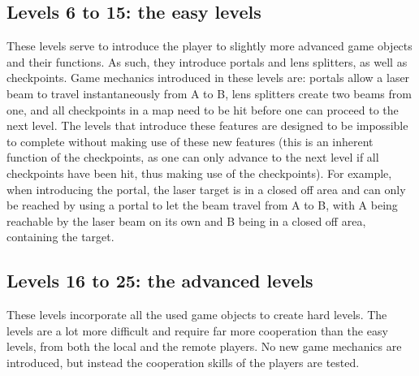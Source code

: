 		\subsection{Levels 6 to 15: the easy levels} \label{ssec: easylevels}
			These levels serve to introduce the player to slightly more advanced
			game objects and their functions. As such, they introduce portals
			and lens splitters, as well as checkpoints. Game mechanics introduced
			in these levels are: portals allow a laser beam to travel instantaneously
			from A to B, lens splitters create two beams from one, and all 
			checkpoints in a map need to be hit before one can proceed to the 
			next level. The levels that introduce these features are designed 
			to be impossible to complete without making use of these new features 
			(this is an inherent function of the checkpoints, as one can only 
			advance to the next level if all checkpoints have been hit, thus 
			making use of the checkpoints). For example, when introducing the 
			portal, the laser target is in a closed off area and can only be 
			reached by using a portal to let the beam travel from A to B, with A
			being reachable by the laser beam on its own and B being in a closed
			off area, containing the target.
			
		\subsection{Levels 16 to 25: the advanced levels}
			These levels incorporate all the used game objects to create hard
			levels. The levels are a lot more difficult and require
			far more cooperation than the easy levels, from both the local
			and the remote players. No new game mechanics are introduced, but
			instead the cooperation skills of the players are tested.
